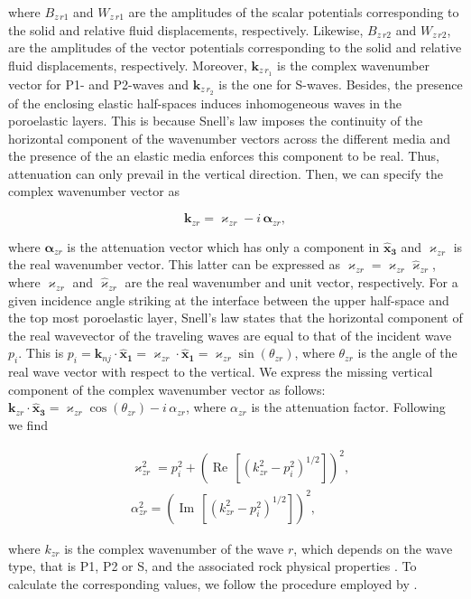 \documentclass[draft]{agujournal2019}
\renewcommand{\Re}{\operatorname{Re} }
\renewcommand{\Im}{\operatorname{Im} }
\begin{document}
where $B_{z\,r1}$ and $W_{z\,r1}$ are the amplitudes of the scalar potentials corresponding to the solid and relative fluid displacements, respectively. Likewise, $B_{z\,r2}$ and $W_{z\,r2}$, are the amplitudes of the vector potentials corresponding to the solid and relative fluid displacements, respectively. Moreover, $\bm{k}_{z\, r_1}$ is the complex wavenumber vector for P1- and P2-waves and $\bm{k}_{z\, r_2}$ is the one for S-waves. Besides,  the  presence of the enclosing elastic half-spaces induces inhomogeneous waves in the poroelastic layers. This is because Snell's law imposes the continuity of the horizontal component of the wavenumber vectors across the different media and the presence of the an elastic media enforces this component to be real. Thus, attenuation can only prevail in the vertical direction. Then, we can specify the complex wavenumber vector as
\begin{linenomath*}
\begin{equation}\label{Eq.a16}
\bm{k}_{zr}= \bm{\varkappa}_{zr} - i\, \bm{\alpha}_{zr},
\end{equation}
\end{linenomath*}
where $\bm{\alpha}_{zr}$ is the attenuation vector which has only a component in $\bm{\hat{x}_3}$ and $\bm{\varkappa}_{zr}$ is the real wavenumber vector. This latter can be expressed as $\bm{\varkappa}_{zr} = \varkappa_{zr} \bm{\hat{\varkappa}}_{zr}$, where $\varkappa_{zr}$ and $\bm{\hat{\varkappa}}_{zr}$  are the  real wavenumber and unit vector, respectively. For a given incidence angle striking at the interface between the upper half-space and the top most poroelastic layer, Snell's law states that the horizontal component of the real wavevector of the traveling waves are equal to that of the incident wave $p_i$. This is $p_i = \bm{k}_{nj} \cdot \bm{\hat{x}_1} =\bm{\varkappa}_{zr} \cdot \bm{\hat{x}_1} = \varkappa_{zr} \sin(\theta_{zr})$, where $\theta_{zr}$ is the angle of the real wave vector with respect to the vertical. 
We express the missing vertical component of the complex wavenumber vector as follows: $\bm{k}_{zr} \cdot \bm{\hat{x}_3}= \varkappa_{zr}\cos (\theta_{zr}) - i\, \alpha_{zr}$, where $\alpha_{zr}$
is the attenuation factor. Following  we find
\begin{linenomath*}
\begin{equation}\label{Eq.a17}
\begin{split}
& \varkappa_{zr}^2 =p_i^2 + \left(\Re\,[\left( k_{zr}^2 -  p_i^2\right)^{1/2}]\right)^2, \\
& \alpha_{zr}^2 = \left(\Im\,[\left( k_{zr}^2 -  p_i^2\right)^{1/2}]\right)^2, 
\end{split}
\end{equation}
\end{linenomath*}
where $k_{zr}$ is the complex wavenumber of the wave $r$, which depends on the wave type, that is P1, P2 or S, and the associated rock physical properties \cite{Borcherdt1973, Borcherdt1982}. To calculate the corresponding values, we follow the procedure employed by .
\end{document}
